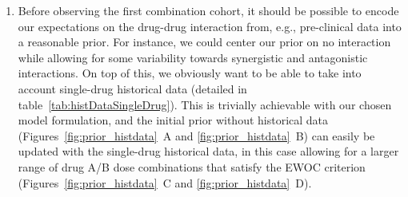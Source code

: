 \documentclass[AMA,STIX1COL]{WileyNJD-v2}
\begin{document}
\begin{enumerate}
\item Before observing the first combination cohort, it should be possible to encode our expectations on the drug-drug interaction from, e.g., pre-clinical data into a reasonable prior. For instance, we could center our prior on no interaction while allowing for some variability towards synergistic and antagonistic interactions. On top of this, we obviously want to be able to take into account single-drug historical data (detailed in table~\ref{tab:histDataSingleDrug}). This is trivially achievable with our chosen model formulation, and the initial prior without historical data (Figures~\ref{fig:prior_histdata}~A and \ref{fig:prior_histdata}~B) can easily be updated with the single-drug historical data, in this case allowing for a larger range of drug A/B dose combinations that satisfy the EWOC criterion (Figures~\ref{fig:prior_histdata}~C and \ref{fig:prior_histdata}~D).





\end{enumerate}
\end{document}
